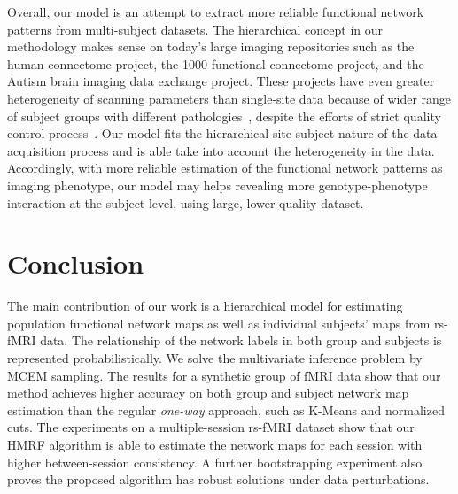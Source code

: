 \documentclass[review,authoryear]{elsarticle}
\begin{document}
Overall, our model is an attempt to extract more reliable functional network
patterns from multi-subject datasets. The hierarchical concept in our
methodology makes sense on today's large imaging repositories such as the human
connectome project, the 1000 functional connectome project, and the Autism
brain imaging data exchange project. These projects have even greater
heterogeneity of scanning parameters than single-site data because of wider
range of subject groups with different pathologies~\citep{smith2012future},
despite the efforts of strict quality control
process~\citep{marcus2013human}. Our model fits the hierarchical site-subject
nature of the data acquisition process and is able take into account the
heterogeneity in the data. Accordingly, with more reliable estimation of the
functional network patterns as imaging phenotype, our model may helps revealing
more genotype-phenotype interaction at the subject level, using large,
lower-quality dataset.

\section{Conclusion}
The main contribution of our work is a hierarchical model for estimating
population functional network maps as well as individual subjects' maps from
rs-fMRI data. The relationship of the network labels in both group and subjects
is represented probabilistically. We solve the multivariate inference problem by
MCEM sampling.  The results for a synthetic group of fMRI data show that our
method achieves higher accuracy on both group and subject network map estimation
than the regular \emph{one-way} approach, such as K-Means and normalized
cuts. The experiments on a multiple-session rs-fMRI dataset show that our HMRF
algorithm is able to estimate the network maps for each session with higher
between-session consistency. A further bootstrapping experiment also proves the
proposed algorithm has robust solutions under data perturbations.

\appendix
\end{document}
